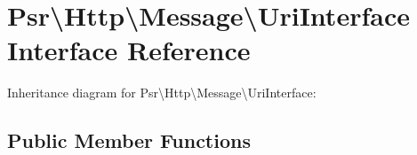 \hypertarget{interfacePsr_1_1Http_1_1Message_1_1UriInterface}{}\section{Psr\textbackslash{}Http\textbackslash{}Message\textbackslash{}Uri\+Interface Interface Reference}
\label{interfacePsr_1_1Http_1_1Message_1_1UriInterface}


Inheritance diagram for Psr\textbackslash{}Http\textbackslash{}Message\textbackslash{}Uri\+Interface\+:
\subsection*{Public Member Functions}
